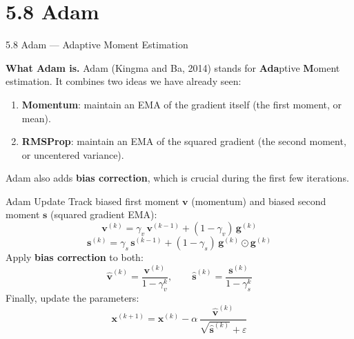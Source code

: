 \documentclass[aspectratio=169,10pt]{beamer}
\newcommand{\vx}{\mathbf{x}}
\newcommand{\vg}{\mathbf{g}}
\newcommand{\vv}{\mathbf{v}}
\newcommand{\vs}{\mathbf{s}}
\begin{document}
\section{5.8 Adam}

\begin{frame}[allowframebreaks]{5.8 Adam --- Adaptive Moment Estimation}

  \textbf{What Adam is.}  Adam (Kingma and Ba, 2014) stands for
  \textbf{Ada}ptive \textbf{M}oment estimation.  It combines
  two ideas we have already seen:
  \begin{enumerate}
    \item \textbf{Momentum}: maintain an EMA of the gradient
          itself (the first moment, or mean).
    \item \textbf{RMSProp}: maintain an EMA of the squared
          gradient (the second moment, or uncentered variance).
  \end{enumerate}
  Adam also adds \textbf{bias correction}, which is crucial
  during the first few iterations.

  \begin{block}{Adam Update}
    Track biased first moment $\vv$ (momentum) and biased
    second moment $\vs$ (squared gradient EMA):
    \[
      \vv^{(k)} = \gamma_v\,\vv^{(k-1)} + (1-\gamma_v)\,\vg^{(k)}
    \]
    \[
      \vs^{(k)} = \gamma_s\,\vs^{(k-1)}
                + (1-\gamma_s)\,\vg^{(k)}\!\odot\!\vg^{(k)}
    \]
    Apply \textbf{bias correction} to both:
    \[
      \hat{\vv}^{(k)} = \frac{\vv^{(k)}}{1-\gamma_v^k},
      \qquad
      \hat{\vs}^{(k)} = \frac{\vs^{(k)}}{1-\gamma_s^k}
    \]
    Finally, update the parameters:
    \[
      \vx^{(k+1)} = \vx^{(k)}
        - \alpha\,\frac{\hat{\vv}^{(k)}}{\sqrt{\hat{\vs}^{(k)}}+\varepsilon}
    \]
  \end{block}

  \framebreak


\end{frame}
\end{document}
